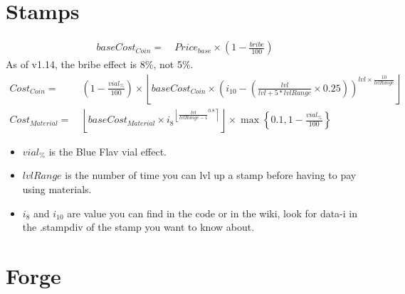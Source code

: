 \section{Stamps}
    \begin{align*}
        baseCost_{Coin} = &\ Price_{base} \times \left(1-\frac{bribe}{100}\right) 
    \end{align*}
    As of v1.14, the bribe effect is 8\%, not 5\%.
    \begin{align*}
        {Cost}_{Coin} = &\
            \left(1-\frac{vial_\%}{100}\right) \times 
            \left\lfloor 
                baseCost_{Coin} \times \left( i_{10} - \left( \frac{lvl}{lvl+5*lvlRange} \times 0.25 \right) \right)^{lvl \times \frac{10}{lvlRange}} 
            \right\rfloor 
    \\
    {Cost}_{Material} = &\
        \left\lfloor 
            baseCost_{Material} \times {i_8}^{
                \left\lfloor \frac{lvl}{lvlRange-1}^{0.8}\right\rceil  
            }
        \right\rfloor
        \times \max \left\{ 0.1, 1-\frac{vial_\%}{100} \right\}
    \end{align*}
    \begin{itemize}
        \item $vial_\%$ is the Blue Flav vial effect.
        \item $lvlRange$ is the number of time you can lvl up a stamp before having to pay using materials.
        \item $i_{8}$ and $i_{10}$ are value you can find in the code or in the wiki, look for data-i in the .stampdiv of the stamp you want to know about.
    \end{itemize}

\section{Forge}
    \imp{TODO}

\newpage
